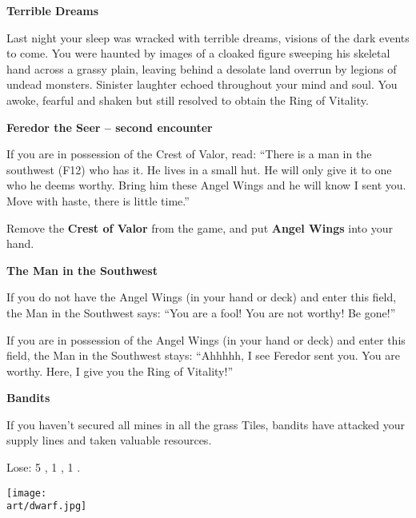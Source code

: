 \begin{multicols*}{2}
\textbf{Terrible Dreams}

Last night your sleep was wracked with terrible dreams, visions of the dark events to come.
You were haunted by images of a cloaked figure sweeping his skeletal hand across a grassy plain, leaving behind a desolate land overrun by legions of undead monsters.
Sinister laughter echoed throughout your mind and soul.
You awoke, fearful and shaken but still resolved to obtain the Ring of Vitality.

\textbf{Feredor the Seer -- second encounter}

If you are in possession of the Crest of Valor, read: ``There is a man in the southwest (F12) who has it.
He lives in a small hut.
He will only give it to one who he deems worthy.
Bring him these Angel Wings and he will know I sent you.
Move with haste, there is little time.''

\textcolor{darkcandyapplered}{Remove the \textbf{Crest of Valor} from the game, and put \textbf{Angel Wings} into your hand.}

\textbf{The Man in the Southwest}

If you do not have the Angel Wings (in your hand or deck) and enter this field, the Man in the Southwest says: ``You are a fool! You are not worthy! Be gone!''

If you are in possession of the Angel Wings (in your hand or deck) and enter this field, the Man in the Southwest stays: ``Ahhhhh, I see Feredor sent you.
You are worthy.
Here, I give you the Ring of Vitality!''


\textbf{Bandits}

If you haven't secured all mines in all the grass Tiles, bandits have attacked your supply lines and taken valuable resources.

\textcolor{darkcandyapplered}{Lose:} 5 , 1 , 1 .

\vspace*{\fill}

\texttt{[image: \\art/dwarf.jpg]}

\end{multicols*}
